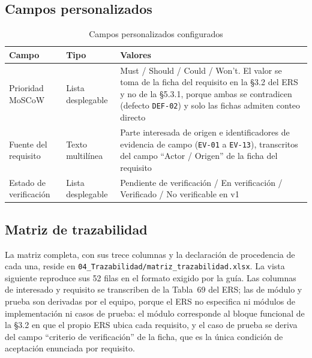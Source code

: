 \documentclass[11pt,letterpaper]{article}
\begin{document}
\subsection{Campos personalizados}

\begin{table}[H]
\centering
\caption{Campos personalizados configurados}
\begin{tabular}{L{4cm} L{3.5cm} L{7cm}}
\toprule
\textbf{Campo} & \textbf{Tipo} & \textbf{Valores}\\
\midrule
Prioridad MoSCoW & Lista desplegable & Must / Should / Could / Won't. El valor se toma de la ficha del requisito en la \S3.2 del ERS y no de la \S5.3.1, porque ambas se contradicen (defecto \texttt{DEF-02}) y solo las fichas admiten conteo directo\\
Fuente del requisito & Texto multilínea & Parte interesada de origen e identificadores de evidencia de campo (\texttt{EV-01} a \texttt{EV-13}), transcritos del campo ``Actor / Origen'' de la ficha del requisito\\
Estado de verificación & Lista desplegable & Pendiente de verificación / En verificación / Verificado / No verificable en v1\\
\bottomrule
\end{tabular}
\end{table}

\subsection{Matriz de trazabilidad}

La matriz completa, con sus trece columnas y la declaración de procedencia de cada una, reside en
\texttt{04\_Trazabilidad/matriz\_trazabilidad.xlsx}. La vista siguiente reproduce sus 52 filas en el
formato exigido por la guía. Las columnas de interesado y requisito se transcriben de la Tabla~69
del ERS; las de módulo y prueba son derivadas por el equipo, porque el ERS no especifica ni módulos
de implementación ni casos de prueba: el módulo corresponde al bloque funcional de la \S3.2 en que
el propio ERS ubica cada requisito, y el caso de prueba se deriva del campo ``criterio de
verificación'' de la ficha, que es la única condición de aceptación enunciada por requisito.
\end{document}
